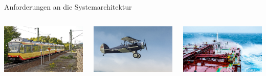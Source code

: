 {\begin{frame}{Anforderungen an die Systemarchitektur}
    \begin{columns}[onlytextwidth]
        \includegraphics[width=\textwidth]{img/anforderungen4}

        \includegraphics[width=\textwidth]{img/anforderungen5}

        \includegraphics[width=\textwidth]{img/anforderungen6}
    \end{columns}
\end{frame}
}

